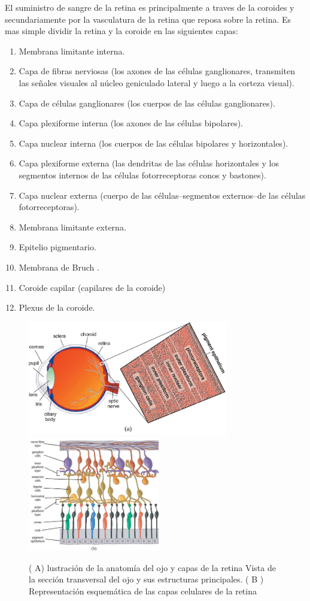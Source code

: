 El suministro de sangre de la retina es principalmente a traves de la coroides y secundariamente por la vasculatura de la retina que reposa sobre la retina. Es mas simple dividir la retina y la coroide en las siguientes capas:
\begin{enumerate}[1.]
    \item Membrana limitante interna.
    \item Capa de fibras nerviosas (los axones de las células ganglionares, transmiten las señales visuales al núcleo geniculado lateral y luego a la corteza visual).
    \item Capa de células ganglionares (los cuerpos de las células ganglionares).
    \item	Capa plexiforme interna (los axones de las células bipolares).
	\item Capa nuclear interna (los cuerpos de las células bipolares y horizontales).
	\item Capa plexiforme externa (las dendritas de las células horizontales y los segmentos internos de las células fotorreceptoras conos y bastones).
	\item Capa nuclear externa (cuerpo de las células--segmentos externos--de las células fotorreceptoras).
	\item Membrana limitante externa.
	\item Epitelio pigmentario.
	\item Membrana de Bruch .
	\item Coroide capilar (capilares de la coroide)
	\item Plexus de la coroide.

\end{enumerate}

\begin{figure}[H]
\centering
\includegraphics[height=5cm]{./Figures/retina_a.png}
\includegraphics[height=5cm]{./Figures/retina_b.png}
\label{fig:retina}
\caption{( A) lustración de la anatomía del ojo y capas de la retina  Vista de la sección transversal
del ojo y sus estructuras principales. ( B ) Representación esquemática de las capas celulares de la retina}
\end{figure}



